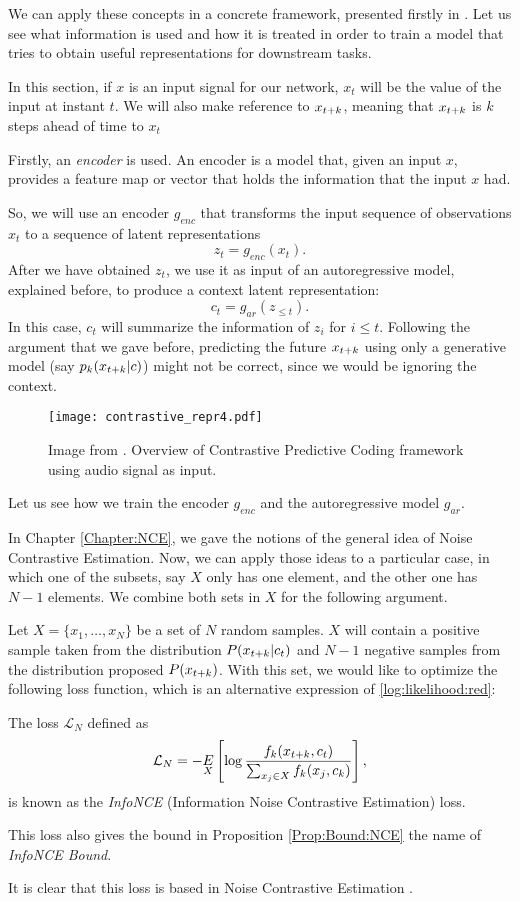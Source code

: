 We can apply these concepts in a concrete framework, presented firstly in \cite{oord_representation_2019}. Let us see what information is used and how it is treated in order to train a model that tries to obtain useful representations for downstream tasks.

In this section, if $x$ is an input signal for our network, $x_t$ will be the value of the input at instant $t$. We will also make reference to $x_{t+k}$, meaning that $x_{t+k}$ is $k$ steps ahead of time to $x_t$

Firstly, an \emph{encoder} is used. An encoder is a model that, given an input $x$, provides a feature map or vector that holds the information that the input $x$ had.

So, we will use an encoder $g_{enc}$ that transforms the input sequence of observations $x_t$ to a sequence of latent representations
$$
z_t = g_{enc}(x_t).
$$
After we have obtained $z_t$, we use it as input of an autoregressive model, explained before, to produce a context latent representation:
$$
c_t = g_{ar}(z_{\leq t}).
$$
In this case, $c_t$ will summarize the information of $z_i$ for $i \leq t$. Following the argument that we gave before, predicting the future $x_{t+k}$ using only a generative model (say $p_k(x_{t+k}|c)$)
might not be correct, since we would be ignoring the context. \\

\begin{figure}[H]
    \centering 
    \texttt{[image: contrastive\_repr4.pdf]}
    \caption{Image from \citep{oord_representation_2019}. Overview of Contrastive Predictive Coding framework using audio signal as input. }
\end{figure}

Let us see how we train the encoder $g_{enc}$ and the autoregressive model $g_{ar}$.

In Chapter \ref{Chapter:NCE}, we gave the notions of the general idea of Noise Contrastive Estimation. Now, we can apply those ideas to a particular case, in which one of the subsets, say $X$ only has one element, and the other one has $N-1$ elements. We combine both sets in $X$ for the following argument.

Let $X = \{x_1,\dots,x_N\}$ be a set of $N$ random samples. $X$ will contain a positive sample taken from the distribution $P( x_{t+k} |c_t)$ and $N-1$ negative
samples from the distribution proposed $P(x_{t+k})$. With this set, we would like to optimize the following loss function, which is an alternative expression of \eqref{log:likelihood:red}:
\begin{ndef}
The loss $\mathcal L_N$ defined as
\begin{equation}\label{NCE:loss}
\mathcal L_N = - \underset{X}{E} \left[\log \frac{f_k(x_{t+k},c_t)}{\sum_{x_j \in X} f_k(x_j,c_k)}\right],
\end{equation}
is known as the \emph{InfoNCE} (Information Noise Contrastive Estimation) loss.

This loss also gives the bound in Proposition \ref{Prop:Bound:NCE} the name of \emph{InfoNCE Bound}.

\end{ndef}
It is clear that this loss is based in Noise Contrastive Estimation \citep{gutmann_noise-contrastive_nodate}.

